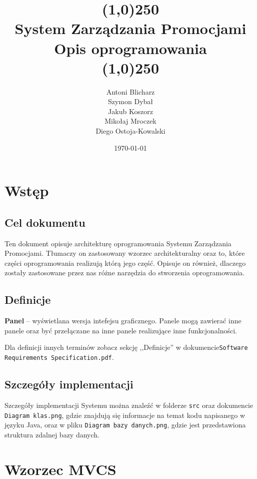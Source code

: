 \documentclass[a4paper,12pt]{article}
\title{
    \line(1,0){250}\\
    System Zarządzania Promocjami\\
    Opis oprogramowania\\
    \line(1,0){250}}
\author{Antoni Blicharz\\
        Szymon Dybał\\
        Jakub Koszorz\\
        Mikołaj Mroczek\\
        Diego Ostoja-Kowalski\\}
\date{\today}
\begin{document}
\begin{titlepage}
    \maketitle
\end{titlepage}

\newpage

\section{Wstęp}

\subsection{Cel dokumentu}

Ten dokument opisuje architekturę oprogramowania Systemu Zarządzania Promocjami.
Tłumaczy on zastosowany wzorzec architekturalny oraz to, które części oprogramowania realizują którą jego część.
Opisuje on również, dlaczego zostały zastosowane przez nas różne narzędzia do stworzenia oprogramowania.

\subsection{Definicje}

\textbf{Panel} -- wyświetlana wersja intefejsu graficznego.
Panele mogą zawierać inne panele oraz być przełączane na inne panele realizujące inne funkcjonalności.

Dla definicji innych terminów zobacz sekcję ,,Definicje'' w dokumencie\linebreak\texttt{Software Requirements Specification.pdf}.

\subsection{Szczegóły implementacji}

Szczegóły implementacji Systemu można znaleźć w folderze \texttt{src} oraz dokumencie \texttt{Diagram klas.png}, gdzie znajdują się informacje na temat kodu napisanego w języku Java, oraz w pliku \texttt{Diagram bazy danych.png}, gdzie jest przedstawiona struktura zdalnej bazy danych.

\section{Wzorzec MVCS}
\end{document}
